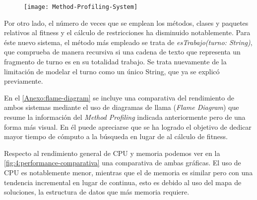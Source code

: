 \begin{figure}
	\centering
	\texttt{[image: Method-Profiling-System]}
	\caption{}
	\label{fig:4:method-profiling-system}
\end{figure}



Por otro lado, el número de veces que se emplean los métodos, clases y paquetes relativos al fitness y el cálculo de restricciones ha disminuido notablemente. Para éste nuevo sistema, el método más empleado se trata de \textit{esTrabajo(turno: String)}, que comprueba de manera recursiva si una cadena de texto que representa un fragmento de turno es en su totalidad trabajo. Se trata nuevamente de la limitación de modelar el turno como un único String, que ya se explicó previamente.

En el \autoref{Anexo:flame-diagram} se incluye una comparativa del rendimiento de ambos sistemas mediante el uso de diagramas de llama (\textit{Flame Diagram}) que resume la información del \textit{Method Profiling} indicada anteriormente pero de una forma más visual. En él puede apreciarse que se ha logrado el objetivo de dedicar mayor tiempo de cómputo a la búsqueda en lugar de al cálculo de fitness.


Respecto al rendimiento general de CPU y memoria podemos ver en la \autoref{fig:4:performance-comparativa} una comparativa de ambas gráficas. El uso de CPU es notablemente menor, mientras que el de memoria es similar pero con una tendencia incremental en lugar de continua, esto es debido al uso del mapa de soluciones, la estructura de datos que más memoria requiere.


